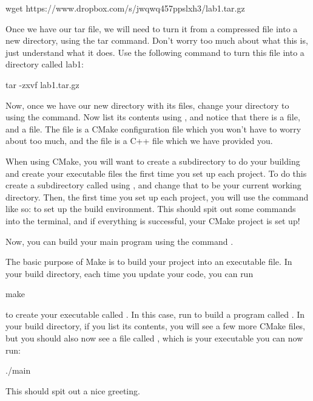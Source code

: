 \documentclass{tufte-handout}
\begin{document}
\begin{CmdLine}
  \prompt wget https://www.dropbox.com/s/jwqwq457ppslxh3/lab1.tar.gz
\end{CmdLine}

Once we have our tar file, we will need to turn it from a compressed
file into a new directory, using the tar command.  Don't worry too much
about what this is, just understand what it does.  Use the following
command to turn this file into a directory called lab1:

\begin{CmdLine}
  \prompt tar -zxvf lab1.tar.gz
\end{CmdLine}

Now, once we have our new directory with its files, change your
directory to  using the  command.  Now list
its contents using , and notice that there is a
 file, and a  file. The
 file is a CMake configuration file which you
won't have to worry about too much, and the  file is
a C++ file which we have provided you.

When using CMake, you will want to create a subdirectory to do your
building and create your executable files the first time you set up each
project.  To do this create a subdirectory called  using
, and change that to be your current working directory.
Then, the first time you set up each project, you will use the
 command like so:  to set up the build environment.  This should spit
out some commands into the terminal, and if everything is successful,
your CMake project is set up!

Now, you can build your main program using the command .

The basic purpose of Make is to build your project into an executable file.
In your build directory, each time you update your code, you can run

\begin{CmdLine}
  \prompt make 
\end{CmdLine}

\noindent to create your executable called .  In
this case, run  to build a program called
.  In your build directory, if you list its contents, you
will see a few more CMake files, but you should also now see a file
called , which is your executable you can now run:

\begin{CmdLine}
  \prompt ./main
\end{CmdLine}

\noindent
This should spit out a nice greeting.
\end{document}
